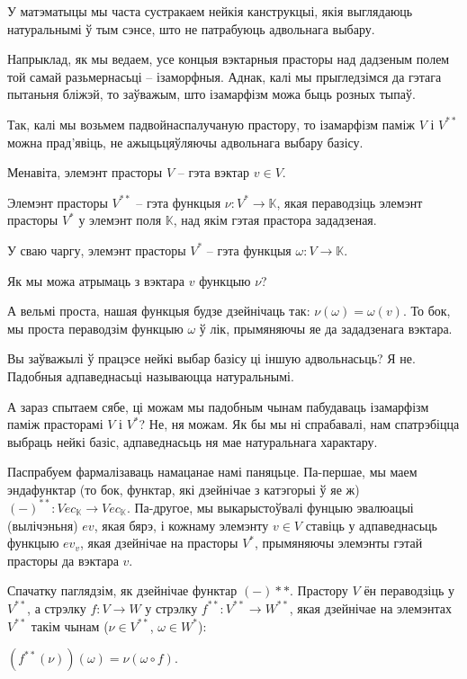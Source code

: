 \documentclass[a4paper,12pt]{book}
\begin{document}
У матэматыцы мы часта сустракаем нейкія канструкцыі, якія выглядаюць
натуральнымі ў тым сэнсе, што не патрабуюць адвольнага выбару.

Напрыклад, як мы ведаем, усе концыя вэктарныя прасторы над дадзеным
полем той самай разьмернасьці -- ізаморфныя. Аднак, калі мы
прыгледзімся да гэтага пытаньня бліжэй, то заўважым, што ізамарфізм
можа быць розных тыпаў.

Так, калі мы возьмем падвойнаспалучаную прастору, то ізамарфізм паміж
$V$ і $V^{**}$ можна прад'явіць, не ажыцьцяўляючы адвольнага выбару
базісу.

Менавіта, элемэнт прасторы $V$ -- гэта вэктар $v \in V$.

Элемэнт прасторы $V^{**}$ -- гэта функцыя $\nu: V^* \rightarrow
\mathbb{K}$, якая пераводзіць элемэнт прасторы $V^*$ у элемэнт поля
$\mathbb{K}$, над якім гэтая прастора зададзеная.

У сваю чаргу, элемэнт прасторы $V^*$ -- гэта функцыя $\omega: V
\rightarrow \mathbb{K}$.

Як мы можа атрымаць з вэктара $v$ функцыю $\nu$?

А вельмі проста, нашая функцыя будзе дзейнічаць так: $\nu(\omega) =
\omega(v)$. То бок, мы проста пераводзім функцыю $\omega$ ў лік,
прымяняючы яе да зададзенага вэктара.

Вы заўважылі ў працэсе нейкі выбар базісу ці іншую адвольнасьць? Я
не. Падобныя адпаведнасьці называюцца натуральнымі.

А зараз спытаем сябе, ці можам мы падобным чынам пабудаваць ізамарфізм
паміж прасторамі $V$ і $V^*$? Не, ня можам. Як бы мы ні спрабавалі,
нам спатрэбіцца выбраць нейкі базіс, адпаведнасьць ня мае натуральнага
характару.

Паспрабуем фармалізаваць намацанае намі паняцьце. Па-першае, мы маем
эндафунктар (то бок, функтар, які дзейнічае з катэгорыі ў яе ж)
$(-)^{**}: Vec_{\mathbb{K}} \rightarrow Vec_{\mathbb{K}}$. Па-другое,
мы выкарыстоўвалі фунцыю эвалюацыі (вылічэньня) $ev$,
якая бярэ, і кожнаму элемэнту $v \in V$ ставіць у адпаведнасьць
функцыю $ev_v$, якая дзейнічае на прасторы $V^*$, прымяняючы элемэнты
гэтай прасторы да вэктара $v$.

Спачатку паглядзім, як дзейнічае функтар $(-)**$. Прастору $V$ ён
пераводзіць у $V^{**}$, а стрэлку $f: V \rightarrow W$ у стрэлку
$f^{**}: V^{**} \rightarrow W^{**}$, якая дзейнічае на элемэнтах
$V^{**}$ такім чынам ($\nu \in V^{**}$, $\omega \in W^{*}$):

$(f^{**}(\nu))(\omega) = \nu(\omega \circ f)$.
\end{document}

